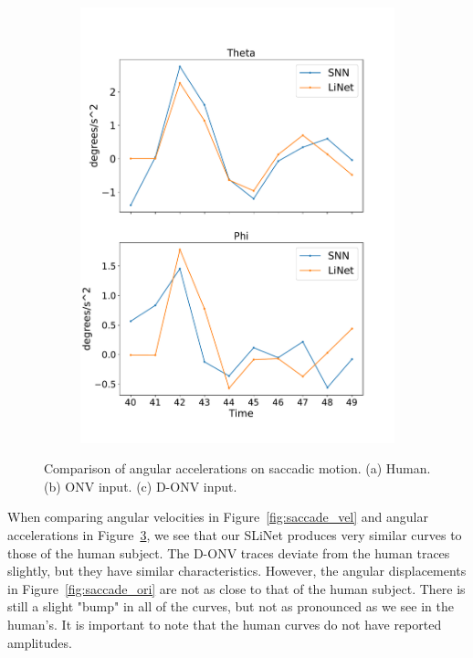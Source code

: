 \documentclass [MS] {UCLAthesis}
\begin{document}
\begin{figure}
\begin{subfigure}{0.2\textwidth}
        \caption{}
        \label{fig:saccade_human_acc_normal}
    \end{subfigure}
    \hfill
    \begin{subfigure}{0.2\textwidth}
        \centering
        \includegraphics[width=\textwidth]{saccade_human_acc_delta}
        \caption{}
        \label{fig:saccade_human_acc_delta}
    \end{subfigure}

    \caption[Angular accelerations from saccadic motion, compared to a human subject]{Comparison of angular accelerations on saccadic motion. (a) Human. (b) ONV input. (c) D-ONV input.}
    \label{fig:saccade_acc}
\end{figure}

When comparing angular velocities in Figure~\ref{fig:saccade_vel} and angular accelerations in Figure~\ref{fig:saccade_acc}, we see that our SLiNet produces very similar curves to those of the human subject. The D-ONV traces deviate from the human traces slightly, but they have similar characteristics. However, the angular displacements in Figure~\ref{fig:saccade_ori} are not as close to that of the human subject. There is still a slight "bump" in all of the curves, but not as pronounced as we see in the human's. It is important to note that the human curves do not have reported amplitudes.
\end{document}
